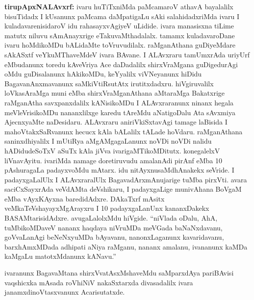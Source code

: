 {\large\textbf{tirupApxNALAvxrf:}} ivaru huTiTxniMda paMcamaroV athavA bayalalilx bisuTidadx I kUsanunx paMcama daMpatigaLu sAki salahidadxriMda ivaru I kuladavarenisidaroV idu rahasayxvAgiyeV uLidide. ivara manasisxna tiLime matutx niluvu sAmAnayxrige eTakuvaMthadalalx. tamamx kuladavaroDane ivaru hoMdikoMDu bALidaMte toVruvudilalx. raMganAthana guDiyeMdare sAkASxtf veYkuMThaveMdeV ivara BAvane. I ALAvxraru tamUmxrAda uriyUrf eMbudanunx toredu kAveVriya Ace daDadalilx shirxVraMgana guDigedurAgi oMdu guDisalanunx hAkikoMDu, keYyalilx viVNeyanunx hiDidu BagavanAnxmavanunx saMkiVtiRsutAtx irutitxdadxru. hiVgiruvalilx loVkasAraMga muni eMba shirxVraMganAthana aMtaraMga Bakatxrige raMganAtha savxpanxdalilx kANisikoMDu I ALAvxraranunx ninanx hegala meVleVrisikoMDu nananxlilxge karedu tAreMdu aNatigoDalu Ata sAvxmiya AjecnxyaMte naDesidaru. ALAvxraru aniriVkiSxtavAgi tamage laBisida I mahoVtakxSaRvanunx hecucx kAla bALalilx tALade hoVdaru. raMganAthana saninxdhiyalilx I mUtiRya aMgAMgagaLanunx noVDi noVDi nalidu hADidudeSoTxV aSuTx kAla jiVva ivarigaMTikoMDitutx. konegalelxV liVnavAyitu. ivariMda namage doretiruvudu amalanAdi pirAnf eMba 10 pAshuragaLa padayxvoMdu mAtarx. idu nitAyxnusaMdhAnakekx seVride. I padayxgaLalUlx I ALAvxraralUlx BagavadArxmAnujarige tuMba pirxVti. avara saciCxSayxrAda veVdAMta deVshikaru, I padayxgaLige munivAhana BoVgaM eMba vAyxKAyxna baredidAdxre. DAkaTxrf mAsitx veMkaTeVshayayxMgArayxru I 10 padayxgaLanUnx kananxDakekx BASAMtarisidAdxre. avugaLalolxMdu hiVgide. ``niVlada oDalu, AhA, tuMbikoMDaveV nananx haqdaya niVruMDa meVGada baNaNxdavanu, goVvaLanAgi beNeNxyuMDa bAyavanu, nanonxLaganunx kavaridavanu, barxhAmxMDada adhipati aNiya raMganu, nananx amalanu, ivananunx kaMDa kaMgaLu matotxMdanunx kANavu.''

ivaranunx BagavaMtana shirxVvatAsxMshaveMdu saMparxdAya pariBAvisi vaqshicxka mAsada roVhiNiV nakaSxtarxda divasadalilx ivara janamxdinoVtasxvanunx Acarisutatxde.

\newpage

